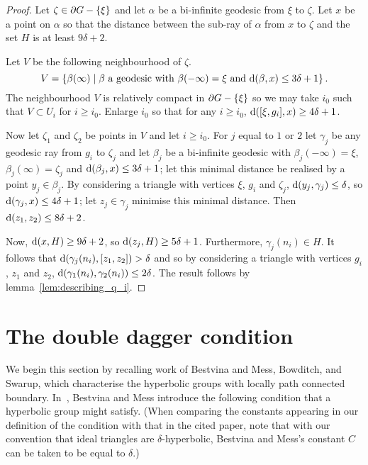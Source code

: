 \documentclass[a4paper]{article}
\begin{document}
\begin{proof}
  Let $\zeta \in \partial G - \left\{\xi\right\}$ and let $\alpha$ be a bi-infinite
  geodesic from $\xi$ to $\zeta$. Let $x$ be a point on $\alpha$ so that the
  distance between the sub-ray of $\alpha$ from $x$ to $\zeta$ and the set $H$
  is at least $9\delta+2$.

  Let $V$ be the following neighbourhood of $\zeta$.
  \begin{equation*}
    V = \left\{\beta(\infty) \mid \text{$\beta$ a geodesic with
            $\beta(-\infty) = \xi$ and $\operatorname{d}(\beta, x) \leq 3\delta+1$}\right\}.
  \end{equation*}
  The neighbourhood $V$ is relatively compact in $\partial G - \left\{\xi\right\}$ so
  we may take $i_0$ such that $V \subset U_i$ for $i \geq i_0$. Enlarge $i_0$
  so that for any $i \geq i_0$, $\operatorname{d}([\xi, g_i], x) \geq 4\delta+1$.

  Now let $\zeta_1$ and $\zeta_2$ be points in $V$ and let $i \geq i_0$. For
  $j$ equal to $1$ or $2$ let $\gamma_j$ be any geodesic ray from $g_i$ to
  $\zeta_j$ and let $\beta_j$ be a bi-infinite geodesic with $\beta_j(-\infty) =
  \xi$, $\beta_j(\infty) = \zeta_j$ and $\operatorname{d}(\beta_j, x) \leq 3\delta+1$; let
  this minimal distance be realised by a point $y_j \in \beta_j$. By
  considering a triangle with vertices $\xi$, $g_i$ and $\zeta_j$, $\operatorname{d}(y_j,
  \gamma_j) \leq \delta$, so $\operatorname{d}(\gamma_j, x) \leq 4\delta+1$; let $z_j \in
  \gamma_j$ minimise this minimal distance. Then $\operatorname{d}(z_1, z_2) \leq
  8\delta+2$.

  Now, $\operatorname{d}(x, H) \geq 9\delta+2$, so $\operatorname{d}(z_j, H) \geq 5\delta+1$.
  Furthermore, $\gamma_j(n_i) \in H$. It follows that $\operatorname{d}(\gamma_j(n_i), [z_1,
  z_2]) > \delta$ and so by considering a triangle with vertices $g_i$, $z_1$
  and $z_2$, $\operatorname{d}(\gamma_1(n_i), \gamma_2(n_i)) \leq 2\delta$. The result
  follows by lemma~\ref{lem:describing_q_i}. 
\end{proof}

\section{The double dagger condition}\label{sec:double_dagger}

We begin this section by recalling work of Bestvina and Mess, Bowditch, and
Swarup, which characterise the hyperbolic groups with locally path connected
boundary. In~\cite{bestvinamess91}, Bestvina and Mess introduce the following
condition that a hyperbolic group might satisfy. (When comparing the constants
appearing in our definition of the condition with that in the cited paper, note
that with our convention that ideal triangles are $\delta$-hyperbolic, Bestvina
and Mess's constant $C$ can be taken to be equal to $\delta$.)
\end{document}
